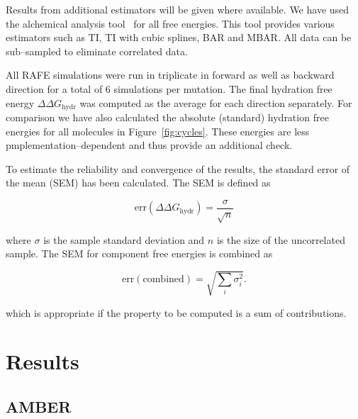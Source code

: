 \documentclass[journal=jctcce,manuscript=article]{achemso}
\begin{document}
Results from additional estimators
will be given where available.  We have used the alchemical analysis
tool~\cite{klimovich_guidelines_2015} for all free energies.  This
tool provides various estimators such as TI, TI with cubic splines,
BAR and MBAR.  All data can be sub--sampled to eliminate correlated
data.

All RAFE simulations were run in triplicate in forward as well as
backward direction for a total of 6 simulations per mutation.  The
final hydration free energy $\Delta\Delta G_{\mathrm{hydr}}$ was
computed as the average for each direction separately.  For comparison we have 
also calculated the absolute (standard) hydration free energies for all
molecules in Figure~\ref{fig:cycles}.  These energies are less 
pmplementation--dependent and thus provide an additional check.

To estimate the reliability and convergence of the results, the
standard error of the mean (SEM) has been calculated.  The SEM is
defined as

\begin{equation}
  \label{eq:sem}
  \mathrm{err}(\Delta\Delta G_{\mathrm{hydr}}) = \frac{\sigma}{\sqrt{n}}
\end{equation}

where $\sigma$ is the sample standard deviation and $n$ is the size of
the uncorrelated sample.  The SEM for component free energies is combined as

\begin{equation}
  \label{eq:sem-comb}
  \mathrm{err}(\mathrm{combined}) = \sqrt{\sum_i \sigma_i^2}.
\end{equation}

which is appropriate if the property to be computed is a sum of
contributions.


\section{Results}
\label{sec:results}


\subsection{AMBER}
\label{sec:amber-results}
\end{document}
